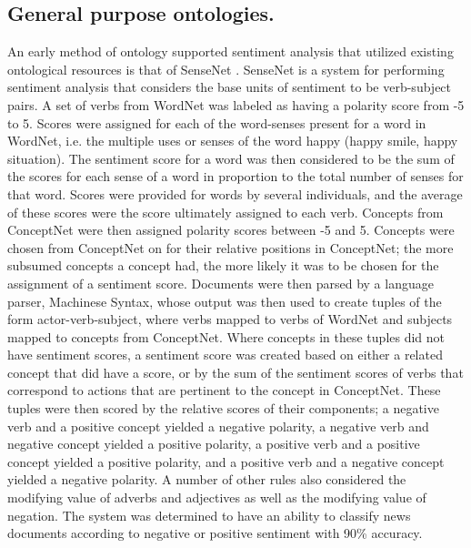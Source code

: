 \documentclass[letterpaper, 10 pt, conference]{ieeeconf}
\begin{document}
\subsection{General purpose ontologies.}
An early method of ontology supported sentiment analysis that utilized existing ontological resources is that of SenseNet \textcolor{gray}{\cite{AlMasum}}. SenseNet is a system for performing sentiment analysis that considers the base units of sentiment to be verb-subject pairs. A set of verbs from WordNet was labeled as having a polarity score from -5 to 5. Scores were assigned for each of the word-senses present for a word in WordNet, i.e. the multiple uses or senses of the word happy (happy smile, happy situation). The sentiment score for a word was then considered to be the sum of the scores for each sense of a word in proportion to the total number of senses for that word. Scores were provided for words by several individuals, and the average of these scores were the score ultimately assigned to each verb. Concepts from ConceptNet were then assigned polarity scores between -5 and 5. Concepts were chosen from ConceptNet on for their relative positions in ConceptNet; the more subsumed concepts a concept had, the more likely it was to be chosen for the assignment of a sentiment score. Documents were then parsed by a language parser, Machinese Syntax, whose output was then used to create tuples of the form actor-verb-subject, where verbs mapped to verbs of WordNet and subjects mapped to concepts from ConceptNet. Where concepts in these tuples did not have sentiment scores, a sentiment score was created based on either a related concept that did have a score, or by the sum of the sentiment scores of verbs that correspond to actions that are pertinent to the concept in ConceptNet. These tuples were then scored by the relative scores of their components; a negative verb and a positive concept yielded a negative polarity, a negative verb and negative concept yielded a positive polarity, a positive verb and a positive concept yielded a positive polarity, and a positive verb and a negative concept yielded a negative polarity. A number of other rules also considered the modifying value of adverbs and adjectives as well as the modifying value of negation. The system was determined to have an ability to classify news documents according to negative or positive sentiment with 90\% accuracy.
\end{document}

